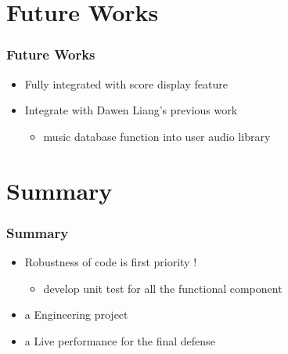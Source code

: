 \documentclass[t]{beamer}
\begin{document}
\section{Future Works}
\begin{frame}
\frametitle{Future Works}
\begin{itemize}
  \item Fully integrated with score display feature 
  \item Integrate with Dawen Liang's previous work
    \begin{itemize}
      \item music database function into user audio library  
    \end{itemize}
\end{itemize}
\end{frame}

\section{Summary}
\begin{frame}
\frametitle{Summary}
\begin{itemize}
  \item Robustness of code is first priority ! 
    \begin{itemize}
      \item develop unit test for all the functional component  
    \end{itemize}
  \item a Engineering project 
  \item a Live performance for the final defense 
\end{itemize}
\end{frame}
\end{document}
